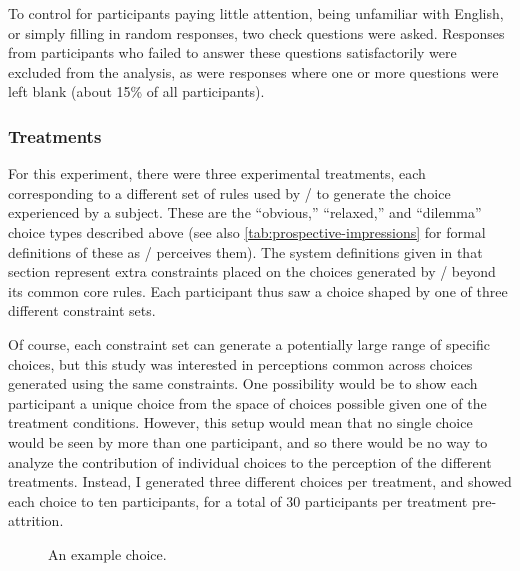 To control for participants paying little attention, being unfamiliar with English, or simply filling in random responses, two check questions were asked.
%
Responses from participants who failed to answer these questions satisfactorily were excluded from the analysis, as were responses where one or more questions were left blank (about 15\% of all participants).

\subsubsection{Treatments}

For this experiment, there were three experimental treatments, each corresponding to a different set of rules used by \dunyazad/ to generate the choice experienced by a subject.
%
These are the ``obvious,'' ``relaxed,'' and ``dilemma'' choice types described above (see also \cref{tab:prospective-impressions} for formal definitions of these as \dunyazad/ perceives them).
%
The system definitions given in that section represent extra constraints placed on the choices generated by \dunyazad/ beyond its common core rules.
%
Each participant thus saw a choice shaped by one of three different constraint sets.


Of course, each constraint set can generate a potentially large range of specific choices, but this study was interested in perceptions common across choices generated using the same constraints.
%
One possibility would be to show each participant a unique choice from the space of choices possible given one of the treatment conditions.
%
However, this setup would mean that no single choice would be seen by more than one participant, and so there would be no way to analyze the contribution of individual choices to the perception of the different treatments.
%
Instead, I generated three different choices per treatment, and showed each choice to ten participants, for a total of 30 participants per treatment pre-attrition.

\begin{figure}[!h]
  \caption{An example choice.}
  \label{fig:results-exchoice}
\end{figure}


